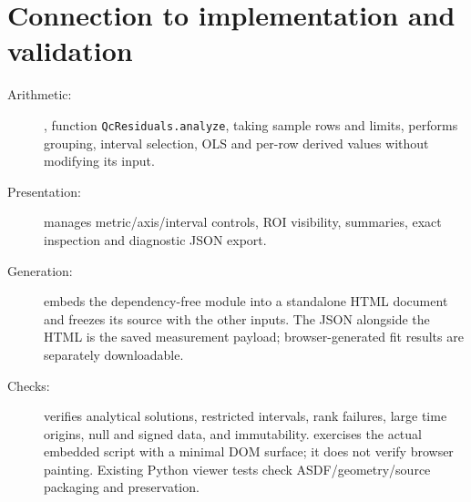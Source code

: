\documentclass[11pt,a4paper]{article}
\begin{document}
\section{Connection to implementation and validation}
\begin{description}
\item[Arithmetic:] , function
\texttt{QcResiduals.analyze}, taking sample rows and limits, performs grouping, interval
selection, OLS and per-row derived values without modifying its input.
\item[Presentation:]  manages metric/axis/interval
controls, ROI visibility, summaries, exact inspection and diagnostic JSON export.
\item[Generation:]  embeds the dependency-free module
into a standalone HTML document and freezes its source with the other inputs.
The JSON alongside the HTML is the saved measurement payload; browser-generated
fit results are separately downloadable.
\item[Checks:]  verifies analytical
solutions, restricted intervals, rank failures, large time origins, null and signed
data, and immutability.  exercises the actual
embedded script with a minimal DOM surface; it does not verify browser painting.
Existing Python viewer tests check ASDF/geometry/source packaging and preservation.
\end{description}
\end{document}
